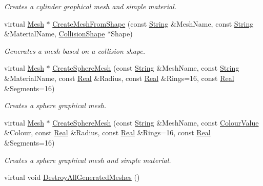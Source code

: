 \begin{DoxyCompactItemize}
\begin{DoxyCompactList}\small\item\em Creates a cylinder graphical mesh and simple material. \item\end{DoxyCompactList}\item 
virtual \hyperlink{classMezzanine_1_1Mesh}{Mesh} $\ast$ \hyperlink{classMezzanine_1_1MeshManager_a75424e13a23151fa96ef0626962034a0}{CreateMeshFromShape} (const \hyperlink{namespaceMezzanine_acf9fcc130e6ebf08e3d8491aebcf1c86}{String} \&MeshName, const \hyperlink{namespaceMezzanine_acf9fcc130e6ebf08e3d8491aebcf1c86}{String} \&MaterialName, \hyperlink{classMezzanine_1_1CollisionShape}{CollisionShape} $\ast$Shape)
\begin{DoxyCompactList}\small\item\em Generates a mesh based on a collision shape. \item\end{DoxyCompactList}\item 
virtual \hyperlink{classMezzanine_1_1Mesh}{Mesh} $\ast$ \hyperlink{classMezzanine_1_1MeshManager_a237f66b9471261d6a0ef6d565740ea15}{CreateSphereMesh} (const \hyperlink{namespaceMezzanine_acf9fcc130e6ebf08e3d8491aebcf1c86}{String} \&MeshName, const \hyperlink{namespaceMezzanine_acf9fcc130e6ebf08e3d8491aebcf1c86}{String} \&MaterialName, const \hyperlink{namespaceMezzanine_a726731b1a7df72bf3583e4a97282c6f6}{Real} \&Radius, const \hyperlink{namespaceMezzanine_a726731b1a7df72bf3583e4a97282c6f6}{Real} \&Rings=16, const \hyperlink{namespaceMezzanine_a726731b1a7df72bf3583e4a97282c6f6}{Real} \&Segments=16)
\begin{DoxyCompactList}\small\item\em Creates a sphere graphical mesh. \item\end{DoxyCompactList}\item 
virtual \hyperlink{classMezzanine_1_1Mesh}{Mesh} $\ast$ \hyperlink{classMezzanine_1_1MeshManager_a1373def36d801ef524372c76852984ec}{CreateSphereMesh} (const \hyperlink{namespaceMezzanine_acf9fcc130e6ebf08e3d8491aebcf1c86}{String} \&MeshName, const \hyperlink{classMezzanine_1_1ColourValue}{ColourValue} \&Colour, const \hyperlink{namespaceMezzanine_a726731b1a7df72bf3583e4a97282c6f6}{Real} \&Radius, const \hyperlink{namespaceMezzanine_a726731b1a7df72bf3583e4a97282c6f6}{Real} \&Rings=16, const \hyperlink{namespaceMezzanine_a726731b1a7df72bf3583e4a97282c6f6}{Real} \&Segments=16)
\begin{DoxyCompactList}\small\item\em Creates a sphere graphical mesh and simple material. \item\end{DoxyCompactList}\item 
\hypertarget{classMezzanine_1_1MeshManager_ad6ef502c838312f778c5ca77c706f20d}{
virtual void \hyperlink{classMezzanine_1_1MeshManager_ad6ef502c838312f778c5ca77c706f20d}{DestroyAllGeneratedMeshes} ()}
\label{classMezzanine_1_1MeshManager_ad6ef502c838312f778c5ca77c706f20d}


\end{DoxyCompactItemize}
